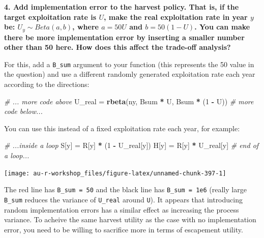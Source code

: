 \documentclass[]{book}
\newenvironment{Shaded}{\begin{snugshade}}{\end{snugshade}}
\newcommand{\CommentTok}[1]{\textcolor[rgb]{0.56,0.35,0.01}{\textit{#1}}}
\newcommand{\DecValTok}[1]{\textcolor[rgb]{0.00,0.00,0.81}{#1}}
\newcommand{\KeywordTok}[1]{\textcolor[rgb]{0.13,0.29,0.53}{\textbf{#1}}}
\newcommand{\NormalTok}[1]{#1}
\newcommand{\OperatorTok}[1]{\textcolor[rgb]{0.81,0.36,0.00}{\textbf{#1}}}
\newcommand{\StringTok}[1]{\textcolor[rgb]{0.31,0.60,0.02}{#1}}
\begin{document}
\textbf{4. Add implementation error to the harvest policy. That is, if the target exploitation rate is \(U\), make the real exploitation rate in year \(y\) be: \(U_y \sim Beta(a,b)\), where \(a = 50U\) and \(b = 50(1-U)\). You can make there be more implementation error by inserting a smaller number other than 50 here. How does this affect the trade-off analysis?}

For this, add a \texttt{B\_sum} argument to your function (this represents the 50 value in the question) and use a different randomly generated exploitation rate each year according to the directions:

\begin{Shaded}
\begin{Highlighting}[]
\CommentTok{# ... more code above}
\NormalTok{U_real =}\StringTok{ }\KeywordTok{rbeta}\NormalTok{(ny, Bsum }\OperatorTok{*}\StringTok{ }\NormalTok{U, Bsum }\OperatorTok{*}\StringTok{ }\NormalTok{(}\DecValTok{1} \OperatorTok{-}\StringTok{ }\NormalTok{U))}
\CommentTok{# more code below...}
\end{Highlighting}
\end{Shaded}

You can use this instead of a fixed exploitation rate each year, for example:

\begin{Shaded}
\begin{Highlighting}[]
\CommentTok{# ...inside a loop}
\NormalTok{S[y] =}\StringTok{ }\NormalTok{R[y] }\OperatorTok{*}\StringTok{ }\NormalTok{(}\DecValTok{1} \OperatorTok{-}\StringTok{ }\NormalTok{U_real[y])}
\NormalTok{H[y] =}\StringTok{ }\NormalTok{R[y] }\OperatorTok{*}\StringTok{ }\NormalTok{U_real[y]}
\CommentTok{# end of a loop...}
\end{Highlighting}
\end{Shaded}

\begin{center}\texttt{[image: au-r-workshop\_files/figure-latex/unnamed-chunk-397-1]} \end{center}

The red line has \texttt{B\_sum\ =\ 50} and the black line has \texttt{B\_sum\ =\ 1e6} (really large \texttt{B\_sum} reduces the variance of \texttt{U\_real} around \texttt{U}). It appears that introducing random implementation errors has a similar effect as increasing the process variance. To acheive the same harvest utility as the case with no implementation error, you need to be willing to sacrifice more in terms of escapement utility.
\end{document}
